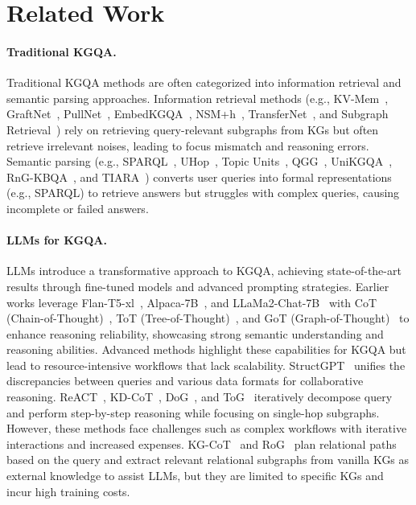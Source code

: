 \documentclass[11pt]{article}
\begin{document}
\section{Related Work}
\label{related work}

\paragraph{Traditional KGQA.}
Traditional KGQA methods are often categorized into information retrieval and semantic parsing approaches. Information retrieval methods (e.g., KV-Mem~\cite{miller-etal-2016-key}, GraftNet~\cite{DBLP:conf/emnlp/SunDZMSC18}, PullNet~\cite{sun-etal-2019-pullnet}, EmbedKGQA~\cite{saxena-etal-2020-improving}, NSM+h~\cite{10.1145/3437963.3441753}, TransferNet~\cite{shi-etal-2021-transfernet}, and Subgraph Retrieval~\cite{zhang-etal-2022-subgraph}) rely on retrieving query-relevant subgraphs from KGs but often retrieve irrelevant noises, leading to focus mismatch and reasoning errors. Semantic parsing (e.g., SPARQL~\cite{sun2020sparqaskeletonbasedsemanticparsing}, UHop~\cite{chen-etal-2019-uhop}, Topic Units~\cite{ijcai2019p701}, QGG~\cite{lan-jiang-2020-query}, UniKGQA~\cite{jiang2023unikgqa}, RnG-KBQA~\cite{ye-etal-2022-rng}, and TIARA~\cite{shu-etal-2022-tiara}) converts user queries into formal representations (e.g., SPARQL) to retrieve answers but struggles with complex queries, causing incomplete or failed answers.
\paragraph{LLMs for KGQA.}\vspace{-5pt}
LLMs introduce a transformative approach to KGQA, achieving state-of-the-art results through fine-tuned models and advanced prompting strategies. Earlier works leverage Flan-T5-xl~\cite{chung2022scalinginstructionfinetunedlanguagemodels}, Alpaca-7B~\cite{alpaca}, and LLaMa2-Chat-7B~\cite{touvron2023llama2openfoundation} with CoT (Chain-of-Thought)~\cite{wei2023chainofthoughtpromptingelicitsreasoning}, ToT (Tree-of-Thought)~\cite{yao2023treethoughtsdeliberateproblem}, and GoT (Graph-of-Thought)~\cite{Besta_2024} to enhance reasoning reliability, showcasing strong semantic understanding and reasoning abilities.
Advanced methods highlight these capabilities for KGQA but lead to resource-intensive workflows that lack scalability.
StructGPT~\cite{jiang2023structgptgeneralframeworklarge} unifies the discrepancies between queries and various data formats for collaborative reasoning. ReACT~\cite{yao2023reactsynergizingreasoningacting}, KD-CoT~\cite{wang2023knowledgedrivencotexploringfaithful}, DoG~\cite{ma2025debate}, and ToG~\cite{sun2023thinkongraph} iteratively decompose query and perform step-by-step reasoning while focusing on single-hop subgraphs. However, these methods face challenges such as complex workflows with iterative interactions and increased expenses. KG-CoT~\cite{inproceedings} and RoG~\cite{luo2024reasoninggraphsfaithfulinterpretable} plan relational paths based on the query and extract relevant relational subgraphs from vanilla KGs as external knowledge to assist LLMs, but they are limited to specific KGs and incur high training costs.
\end{document}
